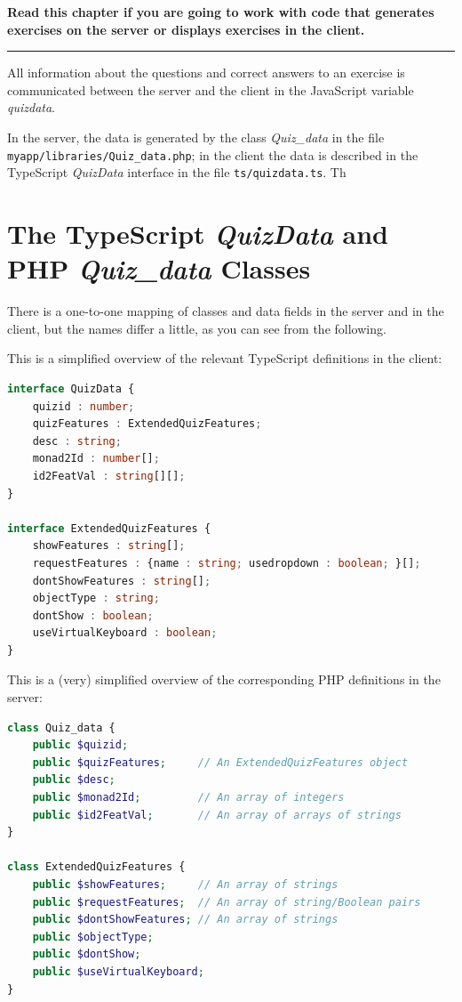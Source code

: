 \documentclass[11pt,oneside,a4paper]{memoir}
\begin{document}
\textbf{Read this chapter if you are going to work with code that generates exercises on
  the server or displays exercises in the client.} 
\plainbreak{3}

All information about the questions and correct answers to an exercise is communicated between the
server and the client in the JavaScript variable \emph{quizdata}.

In the server, the data is generated by the class \emph{Quiz\_data} in the file
\texttt{myapp/\allowbreak{}libraries/\allowbreak{}Quiz\_data.php}; in the client the data is described in the TypeScript
\emph{QuizData} interface in the file \texttt{ts/quizdata.ts}. Th



\section{The TypeScript \emph{QuizData} and PHP \emph{Quiz\_data} Classes}

There is a one-to-one mapping of classes and data fields in the server and in the client, but the
names differ a little, as you can see from the following.

This is a simplified overview of the relevant TypeScript definitions in the client:

\begin{lstlisting}[language=TypeScript]
interface QuizData {
    quizid : number;
    quizFeatures : ExtendedQuizFeatures;
    desc : string;
    monad2Id : number[];
    id2FeatVal : string[][];
}

interface ExtendedQuizFeatures {
    showFeatures : string[];
    requestFeatures : {name : string; usedropdown : boolean; }[];
    dontShowFeatures : string[];
    objectType : string;
    dontShow : boolean;
    useVirtualKeyboard : boolean;
}
\end{lstlisting}

This is a (very) simplified overview of the corresponding PHP definitions in the server:

\begin{lstlisting}[language=PHP]
class Quiz_data {
    public $quizid;
    public $quizFeatures;     // An ExtendedQuizFeatures object
    public $desc;
    public $monad2Id;         // An array of integers
    public $id2FeatVal;       // An array of arrays of strings
}

class ExtendedQuizFeatures {
    public $showFeatures;     // An array of strings
    public $requestFeatures;  // An array of string/Boolean pairs
    public $dontShowFeatures; // An array of strings
    public $objectType;
    public $dontShow;
    public $useVirtualKeyboard;
}
\end{lstlisting}
\end{document}
